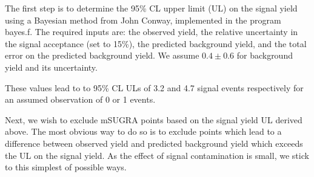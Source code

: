 The first  step is to  determine the 95\%  CL upper limit (UL)  on the
signal yield using a Bayesian  method from John Conway, implemented in
the program bayes.f. The required  inputs are: the observed yield, the
relative  uncertainty in  the  signal acceptance  (set  to 15\%),  the
predicted  background yield,  and  the total  error  on the  predicted
background yield. We assume $0.4 \pm 0.6$ for background yield and its uncertainty.

These values lead to 
to  95\% CL  ULs  of 3.2 and 4.7  signal  events respectively for an assumed observation of 0 or 1 events.

Next, we  wish to exclude mSUGRA  points based on the  signal yield UL
derived above.   The most obvious  way to do  so is to  exclude points
which  lead  to a  difference  between  observed  yield and  predicted
background yield  which exceeds the  UL on the signal  yield. 
As the effect of signal contamination is small, we stick to this simplest 
of possible ways.

